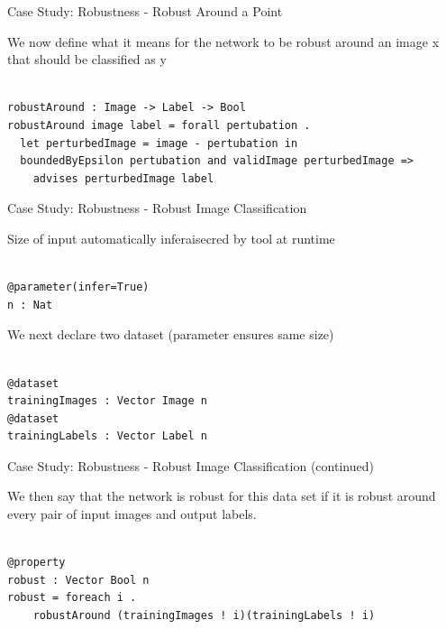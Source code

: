 \documentclass[t,compress,aspectratio=169]{beamer}
\begin{document}
\begin{frame}[fragile]{Case Study: Robustness - Robust Around a Point}

We now define what it means for the network to be robust around an image x that should be classified as y

\begin{verbatim}

robustAround : Image -> Label -> Bool
robustAround image label = forall pertubation .
  let perturbedImage = image - pertubation in
  boundedByEpsilon pertubation and validImage perturbedImage =>
    advises perturbedImage label

\end{verbatim}



\end{frame}

\begin{frame}[fragile]{Case Study: Robustness - Robust Image Classification}

Size of input automatically inferaisecred by tool at runtime
\begin{verbatim}

@parameter(infer=True)
n : Nat

\end{verbatim}

We next declare two dataset (parameter ensures same size)

\begin{verbatim}

@dataset
trainingImages : Vector Image n
@dataset
trainingLabels : Vector Label n
\end{verbatim}
\end{frame}

\begin{frame}[fragile]{Case Study: Robustness - Robust Image Classification (continued)}

We then say that the network is robust for this data set if it is robust around every pair of input images and output labels.

\begin{verbatim}

@property
robust : Vector Bool n
robust = foreach i .
    robustAround (trainingImages ! i)(trainingLabels ! i)
\end{verbatim}



\end{frame}
\end{document}
